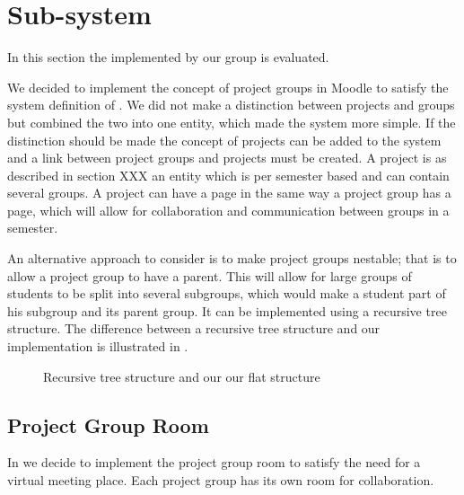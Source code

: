 \section{Sub-system}
In this section the \subsystem{} implemented by our group is evaluated. 

We decided to implement the concept of project groups in Moodle to satisfy the system definition of \system{}.
We did not make a distinction between projects and groups but combined the two into one entity, which made the system more simple. 
If the distinction should be made the concept of projects can be added to the system and a link between project groups and projects must be created.
A project is as described in section XXX an entity which is per semester based and can contain several groups. %
A project can have a page in the same way a project group has a page, which will allow for collaboration and communication between groups in a semester. 

An alternative approach to consider is to make project groups nestable; that is to allow a project group to have a parent.
This will allow for large groups of students to be split into several subgroups, which would make a student part of his subgroup and its parent group.
It can be implemented using a recursive tree structure.
The difference between a recursive tree structure and our implementation is illustrated in .

\begin{figure}%
\caption{Recursive tree structure and our our flat structure}%
\label{fig:recursivetree}%
\end{figure}



\subsection{Project Group Room}
In  we decide to implement the project group room to satisfy the need for a virtual meeting place.
Each project group has its own room for collaboration. 

